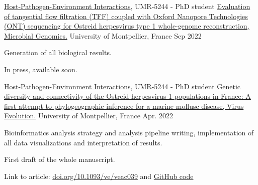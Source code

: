 

\begin{cventries}

  \cventry
    {\href{http://ihpe.univ-perp.fr/}{Host-Pathogen-Environment Interactions}, UMR-5244 - PhD student} %
    {\href{https://www.microbiologyresearch.org/}{Evaluation of tangential flow filtration (TFF) coupled with Oxford Nanopore Technologies (ONT) sequencing for Ostreid herpesvirus type 1 whole-genome reconstruction, Microbial Genomics.}} %
    {University of Montpellier, France} %
    {Sep 2022} %
    {
      \begin{cvitems} %
        \item {Generation of all biological results.}
        \item {In press, available soon.}
      \end{cvitems}
    }

  \cventry
    {\href{http://ihpe.univ-perp.fr/}{Host-Pathogen-Environment Interactions}, UMR-5244 - PhD student} %
    {\href{https://doi.org/10.1093/ve/veac039}{Genetic diversity and connectivity of the Ostreid herpesvirus 1 populations in France: A first attempt to phylogeographic inference for a marine mollusc disease, Virus Evolution.}} %
    {University of Montpellier, France} %
    {Apr. 2022} %
    {
      \begin{cvitems} %
        \item {Bioinformatics analysis strategy and analysis pipeline writing, implementation of all data visualizations and interpretation of results.}
        \item {First draft of the whole manuscript.}
        \item Link to article: {\href{https://doi.org/10.1093/ve/veac039}{doi.org/10.1093/ve/veac039} and  \href{https://github.com/propan2one/OshV-1-molepidemio}{GitHub code}}
      \end{cvitems}
    }
    

\end{cventries}
